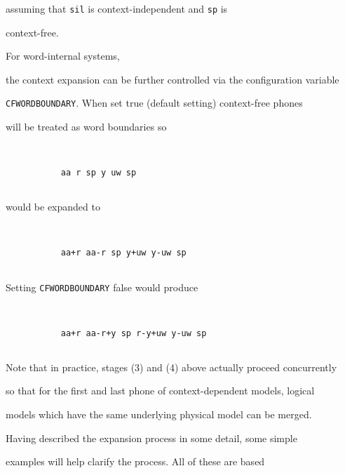 \begin{enumerate}
\begin{verbatim}
\end{verbatim}


assuming that \texttt{sil} is context-independent and \texttt{sp} is


context-free. 


 For word-internal systems, 


the context expansion can be further controlled via the configuration variable


\texttt{CFWORDBOUNDARY}. When set true (default setting) context-free phones


will be treated as word boundaries so


\begin{verbatim}


           aa r sp y uw sp


\end{verbatim}


would be expanded to


\begin{verbatim}


           aa+r aa-r sp y+uw y-uw sp


\end{verbatim}


Setting \texttt{CFWORDBOUNDARY} false would produce


\begin{verbatim}


           aa+r aa-r+y sp r-y+uw y-uw sp


\end{verbatim}





\end{enumerate}


Note that in practice, stages (3) and (4) above actually proceed concurrently


so that for the first and last phone of context-dependent models, logical


models which have the same underlying physical model can be merged.










Having described the expansion process in some detail, some simple


examples will help clarify the process.  All of these are based


